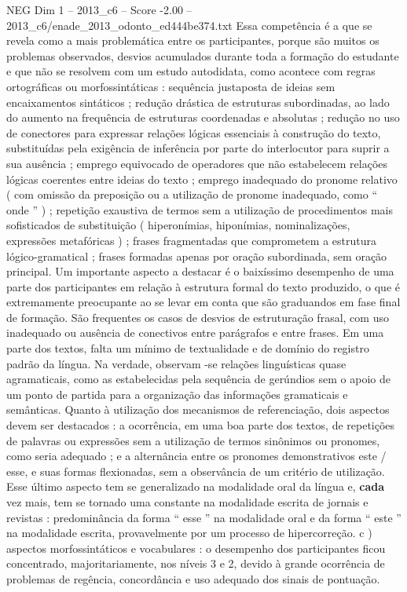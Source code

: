 \begin{textsample}{NEG Dim 1 – 2013\_c6 – Score -2.00 – 2013\_c6/enade\_2013\_odonto\_ed444be374.txt}
Essa competência é a que se revela como a mais problemática entre os participantes, porque são muitos os problemas observados, desvios acumulados durante toda a formação do estudante e que não se resolvem com um estudo autodidata, como acontece com regras ortográficas ou morfossintáticas : sequência justaposta de ideias sem encaixamentos sintáticos ; redução drástica de estruturas subordinadas, ao lado do aumento na frequência de estruturas coordenadas e absolutas ; redução no uso de conectores para expressar relações lógicas essenciais à construção do texto, substituídas pela exigência de inferência por parte do interlocutor para suprir a sua ausência ; emprego equivocado de operadores que não estabelecem relações lógicas coerentes entre ideias do texto ; emprego inadequado do pronome relativo ( com omissão da preposição ou a utilização de pronome inadequado, como “ onde ” ) ; repetição exaustiva de termos sem a utilização de procedimentos mais sofisticados de substituição ( hiperonímias, hiponímias, nominalizações, expressões metafóricas ) ; frases fragmentadas que comprometem a estrutura lógico-gramatical ; frases formadas apenas por oração subordinada, sem oração principal.
Um importante aspecto a destacar é o baixíssimo desempenho de uma parte dos participantes em relação à estrutura formal do texto produzido, o que é extremamente preocupante ao se levar em conta que são graduandos em fase final de formação.
São frequentes os casos de desvios de estruturação frasal, com uso inadequado ou ausência de conectivos entre parágrafos e entre frases.
Em uma parte dos textos, falta um mínimo de textualidade e de domínio do registro padrão da língua.
Na verdade, observam -se relações linguísticas quase agramaticais, como as estabelecidas pela sequência de gerúndios sem o apoio de um ponto de partida para a organização das informações gramaticais e semânticas.
Quanto à utilização dos mecanismos de referenciação, dois aspectos devem ser destacados : a ocorrência, em uma boa parte dos textos, de repetições de palavras ou expressões sem a utilização de termos sinônimos ou pronomes, como seria adequado ; e a alternância entre os pronomes demonstrativos este / esse, e suas formas flexionadas, sem a observância de um critério de utilização.
Esse último aspecto tem se generalizado na modalidade oral da língua e, \textbf{cada} vez mais, tem se tornado uma constante na modalidade escrita de jornais e revistas : predominância da forma “ esse ” na modalidade oral e da forma “ este ” na modalidade escrita, provavelmente por um processo de hipercorreção. c ) aspectos morfossintáticos e vocabulares : o desempenho dos participantes ficou concentrado, majoritariamente, nos níveis 3 e 2, devido à grande ocorrência de problemas de regência, concordância e uso adequado dos sinais de pontuação.

\end{textsample}
